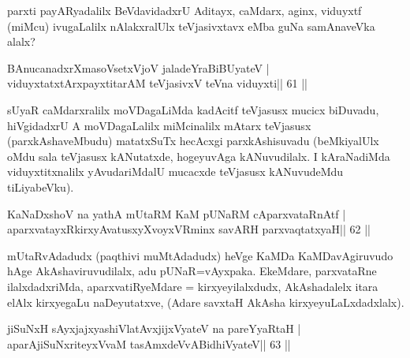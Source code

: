 \begin{artha}
parxti payARyadalilx BeVdavidadxrU Aditayx, caMdarx, aginx, viduyxtf (miMcu) ivugaLalilx nAlakxralUlx teVjasivxtavx eMba guNa samAnaveVka alalx?
\end{artha}


\begin{shl}
BAnucanadxrXmasoVsetxVjoV jaladeYraBiBUyateV |
viduyxtatxtArxpayxtitarAM teVjasivxV teVna viduyxti\hfill || 61 ||
\end{shl}

\begin{artha}
sUyaR caMdarxralilx moVDagaLiMda kadAcitf teVjasusx mucicx biDuvadu, hiVgidadxrU A moVDagaLalilx miMcinalilx mAtarx teVjasusx (parxkAshaveMbudu) matatxSuTx hecAcxgi parxkAshisuvadu (beMkiyalUlx oMdu sala teVjasusx kANutatxde, hogeyuvAga kANuvudilalx. I kAraNadiMda viduyxtitxnalilx yAvudariMdalU mucacxde teVjasusx kANuvudeMdu tiLiyabeVku).
\end{artha}



\begin{shl}
KaNaDxshoV na yathA mUtaRM KaM pUNaRM cAparxvataRnAtf |
aparxvatayxRkirxyAvatusxyXvoyxVRminx savARH parxvaqtatxyaH\hfill || 62 ||
\end{shl}

\begin{artha}
mUtaRvAdadudx (paqthivi muMtAdadudx) heVge KaMDa KaMDavAgiruvudo hAge 
AkAshaviruvudilalx, adu pUNaR=vAyxpaka. EkeMdare, parxvataRne 
ilalxdadxriMda, aparxvatiRyeMdare = kirxyeyilalxdudx, AkAshadalelx 
itara elAlx kirxyegaLu naDeyutatxve, (Adare savxtaH AkAsha 
kirxyeyuLaLxdadxlalx).
\end{artha}



\begin{shl}
jiSuNxH sAyxjajxyashiVlatAvxjijxVyateV na pareYyaRtaH |
aparAjiSuNxriteyxVvaM tasAmxdeVvABidhiVyateV\hfill || 63 ||
\end{shl}


